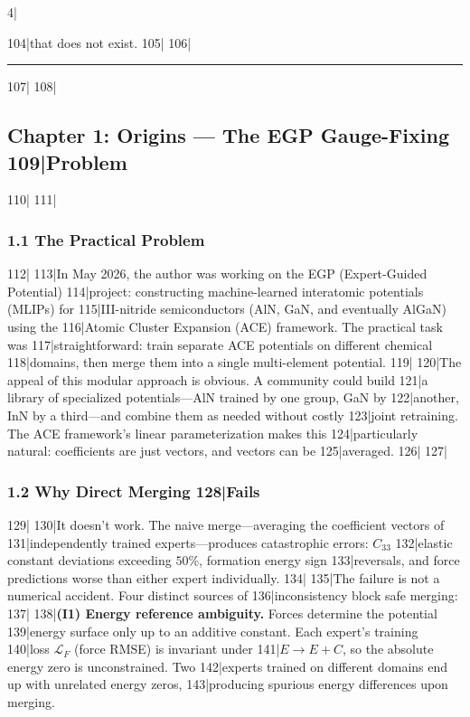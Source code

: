 4|\documentclass[
5|  12pt,
6|]{article}
\begin{document}
104|that does not exist.
105|
106|\begin{center}\rule{0.5\linewidth}{0.5pt}\end{center}
107|
108|\subsection{Chapter 1: Origins --- The EGP Gauge-Fixing
109|Problem}\label{chapter-1-origins-the-egp-gauge-fixing-problem}
110|
111|\subsubsection{1.1 The Practical Problem}\label{the-practical-problem}
112|
113|In May 2026, the author was working on the EGP (Expert-Guided Potential)
114|project: constructing machine-learned interatomic potentials (MLIPs) for
115|III-nitride semiconductors (AlN, GaN, and eventually AlGaN) using the
116|Atomic Cluster Expansion (ACE) framework. The practical task was
117|straightforward: train separate ACE potentials on different chemical
118|domains, then merge them into a single multi-element potential.
119|
120|The appeal of this modular approach is obvious. A community could build
121|a library of specialized potentials---AlN trained by one group, GaN by
122|another, InN by a third---and combine them as needed without costly
123|joint retraining. The ACE framework's linear parameterization makes this
124|particularly natural: coefficients are just vectors, and vectors can be
125|averaged.
126|
127|\subsubsection{1.2 Why Direct Merging
128|Fails}\label{why-direct-merging-fails}
129|
130|It doesn't work. The naive merge---averaging the coefficient vectors of
131|independently trained experts---produces catastrophic errors: \(C_{33}\)
132|elastic constant deviations exceeding \(50\%\), formation energy sign
133|reversals, and force predictions worse than either expert individually.
134|
135|The failure is not a numerical accident. Four distinct sources of
136|inconsistency block safe merging:
137|
138|\textbf{(I1) Energy reference ambiguity.} Forces determine the potential
139|energy surface only up to an additive constant. Each expert's training
140|loss \({\mathcal{L}}_F\) (force RMSE) is invariant under
141|\(E \to E + C\), so the absolute energy zero is unconstrained. Two
142|experts trained on different domains end up with unrelated energy zeros,
143|producing spurious energy differences upon merging.
\end{document}
